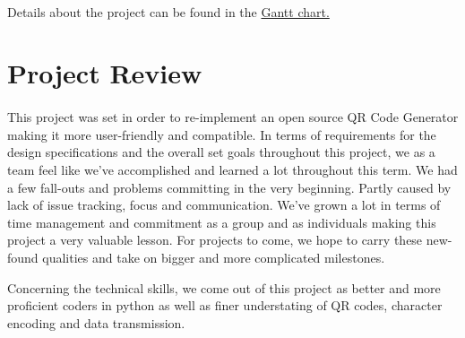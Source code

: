 \documentclass{article}
\begin{document}
	\paragraph{}
		
		Details about the project can be found in the 
		\href{https://gitlab.cas.mcmaster.ca/schiotek/Q-aRt_Code/tree/master/ProjectSchedule/GanttChartQ.gan}{Gantt
		 chart.}
		
\section{Project Review}
    \paragraph{}
        This project was set in order to re-implement an open source QR Code Generator making it more user-friendly and compatible. In terms of requirements for the design specifications and the overall set goals throughout this project, we as a team feel like we've accomplished and learned a lot throughout this term. We had a few fall-outs and problems committing in the very beginning. Partly caused by lack of issue tracking, focus and communication. We've grown a lot in terms of time management and commitment as a group and as individuals making this project a very valuable lesson. For projects to come, we hope to carry these new-found qualities and take on bigger and more complicated milestones.
        
        Concerning the technical skills, we come out of this project as better and more proficient coders in python as well as finer understating of QR codes, character encoding and data transmission.
\end{document}
